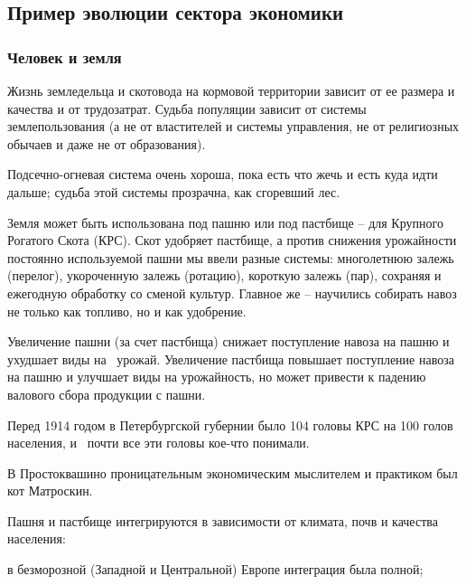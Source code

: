 %
%
\subsection[Пример эволюции сектора экономики]{Пример эволюции сектора экономики}
\subsubsection[Человек и земля]{Человек и земля}

Жизнь земледельца и скотовода на кормовой территории зависит от ее размера и качества и от трудозатрат. Судьба популяции
зависит от системы землепользования (а не от властителей и системы управления, не от религиозных обычаев и даже не от
образования).


Подсечно-огневая система очень хороша, пока есть что жечь и есть куда идти дальше; судьба этой системы прозрачна, как
сгоревший лес.


Земля может быть использована под пашню или под пастбище – для Крупного Рогатого Скота (КРС). Скот удобряет пастбище, а
против снижения урожайности постоянно используемой пашни мы ввели разные системы: многолетнюю залежь (перелог),
укороченную залежь (ротацию), короткую залежь (пар), сохраняя и ежегодную обработку со сменой культур. Главное же –
научились собирать навоз не только как топливо, но и как удобрение.


Увеличение пашни (за счет пастбища) снижает поступление навоза на пашню и ухудшает виды на \ урожай. Увеличение пастбища
повышает поступление навоза на пашню и улучшает виды на урожайность, но может привести к падению валового сбора
продукции с пашни.

Перед 1914 годом в Петербургской губернии было 104 головы КРС на 100 голов населения, и \ почти все эти головы кое-что
понимали.

В Простоквашино проницательным экономическим мыслителем и практиком был кот Матроскин.


Пашня и пастбище интегрируются в зависимости от климата, почв и качества населения:


в безморозной (Западной и Центральной) Европе интеграция была полной;



